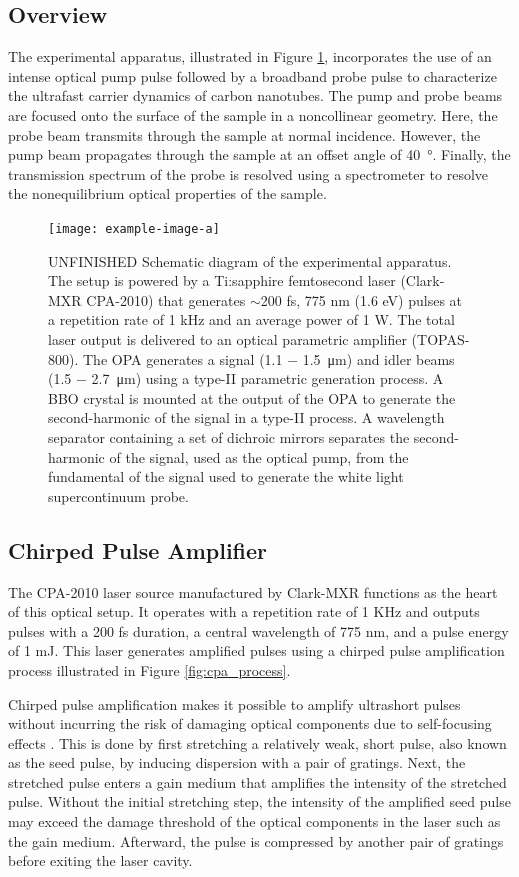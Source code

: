 \subsection{Overview}
The experimental apparatus, illustrated in Figure \ref{fig:setup_schematic}, incorporates the use of an intense optical pump pulse followed by a broadband probe pulse to characterize the ultrafast carrier dynamics of carbon nanotubes. The pump and probe beams are focused onto the surface of the sample in a noncollinear geometry. Here, the probe beam transmits through the sample at normal incidence. However, the pump beam propagates through the sample at an offset angle of \SI{40}{\degree}. Finally, the transmission spectrum of the probe is resolved using a spectrometer to resolve the nonequilibrium optical properties of the sample.


\begin{figure}[ht]
	\centering
	\texttt{[image: example-image-a]}
	\caption{ {\color{red} UNFINISHED} Schematic diagram of the experimental apparatus. The setup is powered by a Ti:sapphire femtosecond laser (Clark-MXR CPA-2010) that generates $\sim$200 fs, 775 nm (1.6 eV) pulses at a repetition rate of 1 kHz and an average power of 1 W. The total laser output is delivered to an optical parametric amplifier (TOPAS-800). The OPA generates a signal (1.1 $-$ \SI{1.5}{\micro\meter}) and idler beams (1.5 $-$ \SI{2.7}{\micro\meter}) using a type-II parametric generation process.  A BBO crystal is mounted at the output of the OPA to generate the second-harmonic of the signal in a type-II process. A wavelength separator containing a set of dichroic mirrors separates the second-harmonic of the signal, used as the optical pump, from the fundamental of the signal used to generate the white light supercontinuum probe.}
	\label{fig:setup_schematic}
\end{figure}


\subsection{Chirped Pulse Amplifier}
The CPA-2010 laser source manufactured by Clark-MXR functions as the heart of this optical setup. It operates with a repetition rate of 1 KHz and outputs pulses with a 200 fs duration, a central wavelength of 775 nm, and a pulse energy of 1 mJ. This laser generates amplified pulses using a chirped pulse amplification process illustrated in Figure \ref{fig:cpa_process}.

Chirped pulse amplification makes it possible to amplify ultrashort pulses without incurring the risk of damaging optical components due to self-focusing effects \cite{strickland1985compression}. This is done by first stretching a relatively weak, short pulse, also known as the seed pulse, by inducing dispersion with a pair of gratings. Next, the stretched pulse enters a gain medium that amplifies the intensity of the stretched pulse. Without the initial stretching step, the intensity of the amplified seed pulse may exceed the damage threshold of the optical components in the laser such as the gain medium. Afterward, the pulse is compressed by another pair of gratings before exiting the laser cavity.

